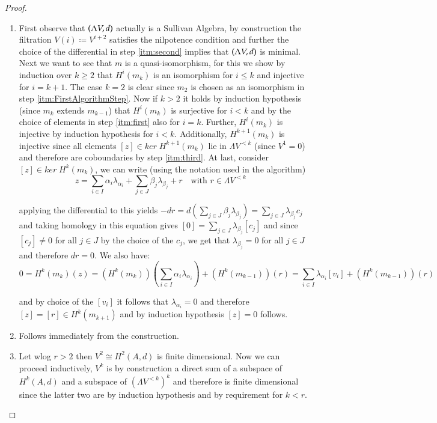 \begin{proof}
\begin{enumerate}
 \item 

 First observe that $(\Lambda V,d)$ actually is a Sullivan Algebra, by construction the filtration $V(i) \coloneqq V^{i+2}$ satisfies
 the nilpotence condition and further the choice of the differential in step \ref{itm:second} implies that $(\Lambda V,d)$ is minimal.
 Next we want to see that $m$ is a quasi-isomorphism, for this we show by induction over $k \geq 2$ that
 $H^i(m_k)$ is an isomorphism for $i \leq k$ and injective for $ i = k +1$. The case $k = 2$ is clear since $m_2$ is chosen
 as an isomorphism in step \ref{itm:FirstAlgorithmStep}. Now if $k > 2$ it holds by induction hypothesis (since $m_k$ extends
 $m_{k-1}$) that $H^i(m_k)$ is surjective for $i < k$ and by the choice of elements in step \ref{itm:first} also for $i = k$.
 Further, $H^i(m_k)$ is injective by induction hypothesis for $i < k$. Additionally, $H^{k+1}(m_k)$ is injective since
 all elements $[z] \in ker \; H^{k+1}(m_k)$ lie in $\Lambda V^{<k}$ (since $V^1 = 0$) and therefore are
 coboundaries by step \ref{itm:third}. At last, consider $[z] \in ker \; H^k (m_k)$, we can write (using the notation used in
 the algorithm)
 $$z = \sum_{i \in I} \alpha_i \lambda_{\alpha_i} + \sum_{j \in J} \beta_j \lambda_{\beta_j} 
 + r \quad \text{with $r \in \Lambda V^{<k}$ }$$
 
 applying the differential to this yields
 $ -dr = d(\sum_{j \in J} \beta_j \lambda_{\beta_j}) = \sum_{j \in J} \lambda_{\beta_j} c_j$
 and taking homology in this equation gives $ [0] = \sum_{j \in J} \lambda_{\beta_j} [c_j]$ and since
 $[c_j] \neq 0$ for all $j \in J$ by the choice of the $c_j$, we get that $\lambda_{\beta_j} = 0$ for all $j \in J$ and 
 therefore $dr = 0$. We also have:
 $$0 = H^{k}(m_k)(z) = (H^k(m_k))( \sum_{i \in I} \alpha_i \lambda_{\alpha_i} ) + (H^k(m_{k-1}))(r)
    = \sum_{i \in I} \lambda_{\alpha_i} [v_i] + (H^k(m_{k-1}))(r) $$
    
and by choice of the $[v_i]$ it follows that $\lambda_{\alpha_i} = 0$ and therefore 
$ [z] = [r] \in H^k ( m_{k+1})$ and by induction hypothesis $[z] = 0$ follows.

 \item Follows immediately from the construction.
 \item Let wlog $r > 2$ then $V^2 \cong H^2(A,d)$ is finite dimensional. Now we can proceed inductively, 
 $V^k$ is by construction a
 direct sum of a subspace of $H^k(A,d)$ and a subspace of $(\Lambda V^{ <k })^k$ and therefore is finite dimensional since
 the latter two are by induction hypothesis and by requirement for $k<r$.
 \end{enumerate}
\end{proof}

